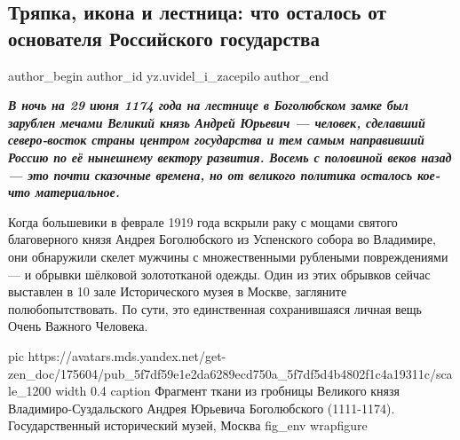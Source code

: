  
 
 
 
 
 
\subsection{Тряпка, икона и лестница: что осталось от основателя Российского государства}
\label{sec:07_10_2020.sites.ru.zen_yandex.yz.uvidel_i_zacepilo.1.andrei_bogolubskii}
\ifcmt
	author_begin
   author_id yz.uvidel_i_zacepilo
	author_end
\fi

\begin{leftbar}
  \begingroup
    \em\Large\bfseries\color{blue}
В ночь на 29 июня 1174 года на лестнице в Боголюбском замке был зарублен мечами
Великий князь Андрей Юрьевич — человек, сделавший северо-восток страны центром
государства и тем самым направивший Россию по её нынешнему вектору развития.
Восемь с половиной веков назад — это почти сказочные времена, но от великого
политика осталось кое-что материальное.
  \endgroup
\end{leftbar}


Когда большевики в феврале 1919 года вскрыли раку с мощами святого благоверного
князя Андрея Боголюбского из Успенского собора во Владимире, они обнаружили
скелет мужчины с множественными рублеными повреждениями — и обрывки шёлковой
золототканой одежды. Один из этих обрывков сейчас выставлен в 10 зале
Исторического музея в Москве, загляните полюбопытствовать. По сути, это
единственная сохранившаяся личная вещь Очень Важного Человека.

\ifcmt
  pic https://avatars.mds.yandex.net/get-zen_doc/175604/pub_5f7df59e1e2da6289ecd750a_5f7df5d4b4802f1c4a19311c/scale_1200
  width 0.4
	caption Фрагмент ткани из гробницы Великого князя Владимиро-Суздальского Андрея Юрьевича Боголюбского (1111-1174). Государственный исторический музей, Москва
	fig_env wrapfigure
\fi

